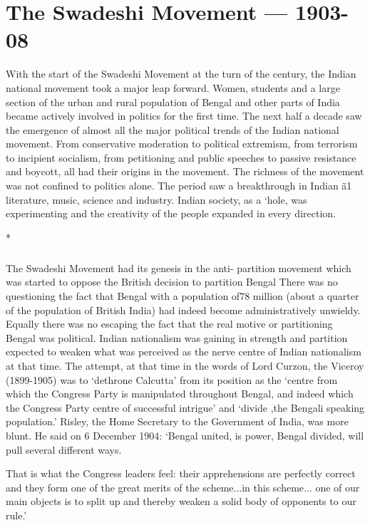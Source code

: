 \cleardoublepage
\chapter{The Swadeshi Movement — 1903-08}

With the start of the Swadeshi Movement at the turn of the century, the Indian national movement took a major leap forward. Women, students and a large section of the urban and rural population of Bengal and other parts of India became actively involved in politics for the first time. The next half a decade saw the emergence of almost all the major political trends of the Indian national movement. From conservative moderation to political extremism, from terrorism to incipient socialism, from petitioning and public speeches to passive resistance and boycott, all had their origins in the movement. The richness of the movement was not confined to politics alone. The period saw a breakthrough in Indian ã1 literature, music, science and industry. Indian society, as a `hole, was experimenting and the creativity of the people expanded in every direction.

\begin{center}*\end{center}

\paragraph*{}
The Swadeshi Movement had its genesis in the anti- partition movement which was started to oppose the British decision to partition Bengal There was no questioning the fact that Bengal with a population of78 million (about a quarter of the population of British India) had indeed become administratively unwieldy. Equally there was no escaping the fact that the real motive or partitioning Bengal was political. Indian nationalism was gaining in strength and partition expected to weaken what was perceived as the nerve centre of Indian nationalism at that time. The attempt, at that time in the words of Lord Curzon, the Viceroy (1899-1905) was to `dethrone Calcutta' from its position as the `centre from which the Congress Party is manipulated throughout Bengal, and indeed which the Congress Party centre of successful intrigue' and `divide ,the Bengali speaking population.' Risley, the Home Secretary to the Government of India, was more blunt. He said on 6 December 1904: `Bengal united, is power, Bengal divided, will pull several different ways.

That is what the Congress leaders feel: their apprehensions are perfectly correct and they form one of the great merits of the scheme...in this scheme... one of our main objects is to split up and thereby weaken a solid body of opponents to our rule.'

